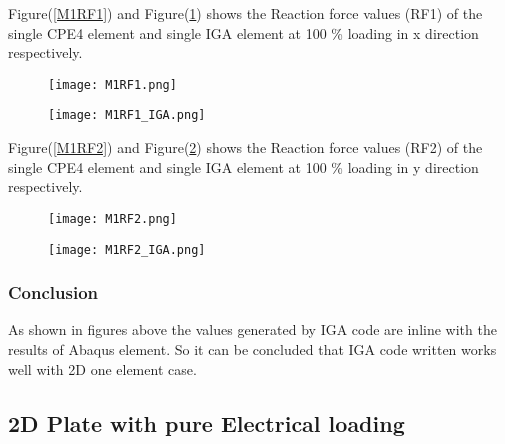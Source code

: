 \documentclass[11pt]{article}
\begin{document}
Figure(\ref{M1RF1}) and Figure(\ref{M1RF1_IGA}) shows the Reaction force values (RF1) of the single CPE4 element and single IGA element at 100 \% loading in x direction respectively. \\
\begin{figure}[H]
	\centering
	\begin{minipage}{.5\textwidth}
		\centering
		\texttt{[image: M1RF1.png]}
		\label{M1RF1}
	\end{minipage}%
	\begin{minipage}{.5\textwidth}
		\centering
		\texttt{[image: M1RF1\_IGA.png]}
		\label{M1RF1_IGA}
	\end{minipage}
\end{figure}
Figure(\ref{M1RF2}) and Figure(\ref{M1RF2_IGA}) shows the Reaction force values (RF2) of the single CPE4 element and single IGA element at 100 \% loading in y direction respectively. \\
\begin{figure}[H]
	\centering
	\begin{minipage}{.5\textwidth}
		\centering
		\texttt{[image: M1RF2.png]}
		\label{M1RF2}
	\end{minipage}%
	\begin{minipage}{.5\textwidth}
		\centering
		\texttt{[image: M1RF2\_IGA.png]}
		\label{M1RF2_IGA}
	\end{minipage}
\end{figure}
\subsubsection{Conclusion}
As shown in figures above the values generated by IGA code are inline with the results of Abaqus element. So it can be concluded that IGA code written works well with 2D one element case.






\subsection{2D Plate with pure Electrical loading}
\end{document}
